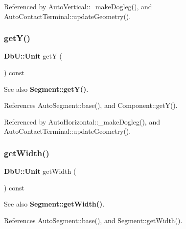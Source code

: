 Referenced by Auto\+Vertical\+::\+\_\+make\+Dogleg(), and Auto\+Contact\+Terminal\+::update\+Geometry().

\mbox{\label{classKatabatic_1_1AutoSegment_a4580de6b074712e400d5d238ce3af054}} 
\subsubsection{\texorpdfstring{get\+Y()}{getY()}}
{\footnotesize\ttfamily \textbf{ Db\+U\+::\+Unit} getY (\begin{DoxyParamCaption}{ }\end{DoxyParamCaption}) const\hspace{0.3cm}{\ttfamily [virtual]}}

\begin{DoxySeeAlso}{See also}
\textbf{ Segment\+::get\+Y()}. 
\end{DoxySeeAlso}


References Auto\+Segment\+::base(), and Component\+::get\+Y().



Referenced by Auto\+Horizontal\+::\+\_\+make\+Dogleg(), and Auto\+Contact\+Terminal\+::update\+Geometry().

\mbox{\label{classKatabatic_1_1AutoSegment_a9c63fe7288748eaf5332ca796a36d872}} 
\subsubsection{\texorpdfstring{get\+Width()}{getWidth()}}
{\footnotesize\ttfamily \textbf{ Db\+U\+::\+Unit} get\+Width (\begin{DoxyParamCaption}{ }\end{DoxyParamCaption}) const\hspace{0.3cm}{\ttfamily [inline]}}

\begin{DoxySeeAlso}{See also}
\textbf{ Segment\+::get\+Width()}. 
\end{DoxySeeAlso}


References Auto\+Segment\+::base(), and Segment\+::get\+Width().

